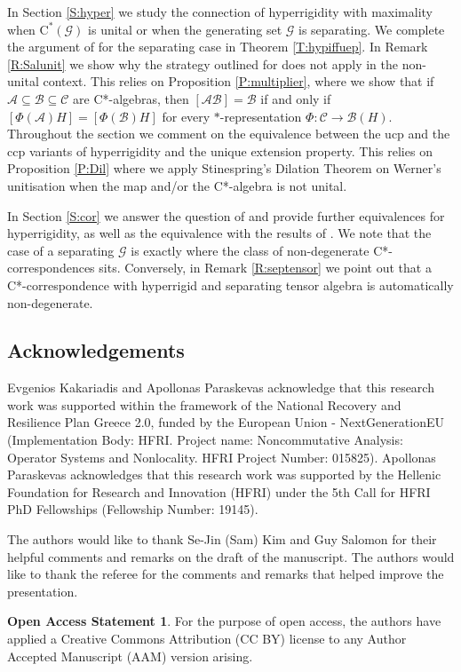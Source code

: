 \documentclass[11pt, draft]{amsart}
\numberwithin{equation}{section}
\theoremstyle{plain}
\theoremstyle{definition}
\newtheorem*{open}{Open Access Statement}
\theoremstyle{remark}
\newcommand{\A}{{\mathcal{A}}}
\newcommand{\B}{{\mathcal{B}}}
\newcommand{\C}{{\mathcal{C}}}
\newcommand{\G}{{\mathcal{G}}}
\newcommand{\ca}{\mathrm{C}^*}
\begin{document}
In Section \ref{S:hyper} we study the connection of hyperrigidity with maximality when $\ca(\G)$ is unital or when the generating set $\G$ is separating.
We complete the argument of \cite[Lemma 2.7, item (ii)]{Sal17} for the separating case in Theorem \ref{T:hypiffuep}.
In Remark \ref{R:Salunit} we show why the strategy outlined for \cite[Lemma 2.7, item (ii)]{Sal17} does not apply in the non-unital context.
This relies on Proposition \ref{P:multiplier}, where we show that if $\A \subseteq \B \subseteq \C$ are C*-algebras, then $[\A \B] = \B$ if and only if $[\Phi(\A)H] = [\Phi(\B)H]$ for every $*$-representation $\Phi \colon \C \to \B(H)$.
Throughout the section we comment on the equivalence between the ucp and the ccp variants of hyperrigidity and the unique extension property.
This relies on Proposition \ref{P:Dil} where we apply Stinespring's Dilation Theorem on Werner's unitisation when the map and/or the C*-algebra is not unital.

In Section \ref{S:cor} we answer the question of \cite{KR20} and provide further equivalences for hyperrigidity, as well as the equivalence with the results of \cite{Kim21}.
We note that the case of a separating $\G$ is exactly where the class of non-degenerate C*-correspondences sits. 
Conversely, in Remark \ref{R:septensor} we point out that a C*-correspondence with hyperrigid and separating tensor algebra is automatically non-degenerate.
\subsection*{Acknowledgements}
Evgenios Kakariadis and Apollonas Paraskevas acknowledge that this research work was supported within the framework of the National Recovery and Resilience Plan Greece 2.0, funded by the European Union - NextGenerationEU (Implementation Body: HFRI. Project name: Noncommutative Analysis: Operator Systems and Nonlocality.
HFRI Project Number: 015825).
Apollonas Paraskevas acknowledges that this research work was supported by the Hellenic Foundation
for Research and Innovation (HFRI) under the 5th Call for HFRI PhD Fellowships (Fellowship Number: 19145).

The authors would like to thank Se-Jin (Sam) Kim and Guy Salomon for their helpful comments and remarks on the draft of the manuscript. The authors would like to thank the referee for the comments and remarks that helped improve the presentation.

\begin{open}
For the purpose of open access, the authors have applied a Creative Commons Attribution (CC BY) license to any Author Accepted Manuscript (AAM) version arising.
\end{open}
\end{document}
